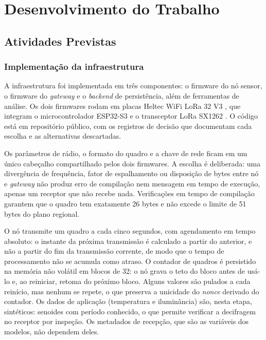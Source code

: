 \chapter{Desenvolvimento do Trabalho} \label{cap:desenvolvimento}
\section{Atividades Previstas}

\subsection{Implementação da infraestrutura}

A infraestrutura foi implementada em três componentes: o firmware do nó sensor, o firmware do \textit{gateway} e o \textit{backend} de persistência, além de ferramentas de análise. Os dois firmwares rodam em placas Heltec WiFi LoRa 32 V3 \cite{heltec_wifi_lora_32_v3}, que integram o microcontrolador ESP32-S3 e o transceptor LoRa SX1262 \cite{semtech_sx1262}. O código está em repositório público, com os registros de decisão que documentam cada escolha e as alternativas descartadas.

Os parâmetros de rádio, o formato do quadro e a chave de rede ficam em um único cabeçalho compartilhado pelos dois firmwares. A escolha é deliberada: uma divergência de frequência, fator de espalhamento ou disposição de bytes entre nó e \textit{gateway} não produz erro de compilação nem mensagem em tempo de execução, apenas um receptor que não recebe nada. Verificações em tempo de compilação garantem que o quadro tem exatamente 26 bytes e não excede o limite de 51 bytes do plano regional.

O nó transmite um quadro a cada cinco segundos, com agendamento em tempo absoluto: o instante da próxima transmissão é calculado a partir do anterior, e não a partir do fim da transmissão corrente, de modo que o tempo de processamento não se acumula como atraso. O contador de quadros é persistido na memória não volátil em blocos de 32: o nó grava o teto do bloco antes de usá-lo e, ao reiniciar, retoma do próximo bloco. Alguns valores são pulados a cada reinício, mas nenhum se repete, o que preserva a unicidade do \textit{nonce} derivado do contador. Os dados de aplicação (temperatura e iluminância) são, nesta etapa, sintéticos: senoides com período conhecido, o que permite verificar a decifragem no receptor por inspeção. Os metadados de recepção, que são as variáveis dos modelos, não dependem deles.

